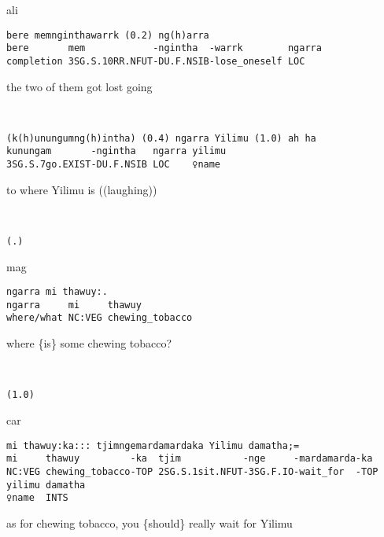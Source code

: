 \documentclass[output=paper,nonflat,colorlinks,citecolor=brown]{langsci/langscibook}
\begin{document}
\vspace{2mm}
%
\begin{transbox}{1}{ali}
\begin{verbatim}
bere memnginthawarrk (0.2) ng(h)arra
bere       mem            -ngintha  -warrk        ngarra
completion 3SG.S.10RR.NFUT-DU.F.NSIB-lose_oneself LOC
\end{verbatim}
the two of them got lost going
\end{transbox}
%
\begin{transbox}{2}{~}
\begin{verbatim}
(k(h)unungumng(h)intha) (0.4) ngarra Yilimu (1.0) ah ha
kunungam       -ngintha   ngarra yilimu
3SG.S.7go.EXIST-DU.F.NSIB LOC    ♀name
\end{verbatim}
to where Yilimu is ((laughing))
\end{transbox}
%
\begin{transbox}{4}{~}
\begin{verbatim}
(.)
\end{verbatim}
\end{transbox}
%
\begin{mdframednoverticalspace}[style=firstfoc]
\begin{transbox}{5}{mag}
\begin{verbatim}
ngarra mi thawuy:.
ngarra     mi     thawuy
where/what NC:VEG chewing_tobacco
\end{verbatim}
where \{is\} some chewing tobacco?
\end{transbox}
\end{mdframednoverticalspace}
%
\begin{transbox}{6}{~}
\begin{verbatim}
(1.0)
\end{verbatim}
\end{transbox}
%
\begin{mdframednoverticalspace}[style=secondfoc]
\begin{transbox}{8}{car}
\begin{verbatim}
mi thawuy:ka::: tjimngemardamardaka Yilimu damatha;=
mi     thawuy         -ka  tjim           -nge     -mardamarda-ka
NC:VEG chewing_tobacco-TOP 2SG.S.1sit.NFUT-3SG.F.IO-wait_for  -TOP
yilimu damatha
♀name  INTS
\end{verbatim}
as for chewing tobacco, you \{should\} really wait for Yilimu
\end{transbox}
\end{mdframednoverticalspace}
\end{document}

